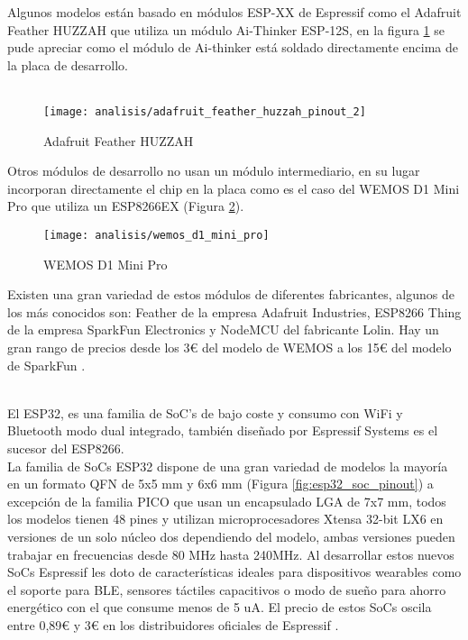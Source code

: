 \documentclass[../proyecto.tex]{subfiles}
\begin{document}
Algunos modelos están basado en módulos ESP-XX de Espressif como el Adafruit Feather HUZZAH \cite{adafruit_feather_huzzah} que utiliza un módulo Ai-Thinker ESP-12S, en la figura \ref{fig:adafruit_feather_huzzah_pinout_2} se pude apreciar como el módulo de Ai-thinker está soldado directamente encima de la placa de desarrollo.\\~\\

\begin{figure}[H]
\centering
\texttt{[image: analisis/adafruit\_feather\_huzzah\_pinout\_2]}
\caption{Adafruit Feather HUZZAH}
\label{fig:adafruit_feather_huzzah_pinout_2}
\end{figure}

Otros módulos de desarrollo no usan un módulo intermediario, en su lugar incorporan directamente el chip en la placa como es el caso del WEMOS D1 Mini Pro \cite{wemos_d1_mini_pro} que utiliza un ESP8266EX (Figura \ref{fig:wemos_d1_mini_pro}).\\

\begin{figure}[h]
\centering
\texttt{[image: analisis/wemos\_d1\_mini\_pro]}
\caption{WEMOS D1 Mini Pro}
\label{fig:wemos_d1_mini_pro}
\end{figure}

Existen una gran variedad de estos módulos de diferentes fabricantes, algunos de los más conocidos son:  Feather de la empresa Adafruit Industries, ESP8266 Thing de la empresa SparkFun Electronics y NodeMCU del fabricante Lolin. Hay un gran rango de precios desde los 3€ del modelo de WEMOS a los 15€ del modelo de SparkFun \cite{espressif_provider_digikey} \cite{espressif_provider_mouser}\cite{sparkfun_thing_official_page}.\\

\pagebreak

\\
El ESP32, es una familia de SoC's de bajo coste y consumo con WiFi y Bluetooth modo dual integrado, también diseñado por Espressif Systems \cite{esp32_overview} es el sucesor del ESP8266.\\

La familia de SoCs ESP32 dispone de una gran variedad de modelos la mayoría en un formato QFN de 5x5 mm y 6x6 mm (Figura \ref{fig:esp32_soc_pinout}) a excepción de la familia PICO que usan un encapsulado LGA de 7x7 mm, todos los modelos tienen 48 pines y utilizan microprocesadores Xtensa 32-bit LX6 en versiones de un solo núcleo dos dependiendo del modelo, ambas versiones pueden trabajar en frecuencias desde 80 MHz hasta 240MHz. Al desarrollar estos nuevos SoCs Espressif les doto de características ideales para dispositivos wearables como el soporte para BLE, sensores táctiles capacitivos o modo de sueño para ahorro energético con el que consume menos de 5  uA. El precio de estos SoCs oscila entre 0,89€ y 3€ en los distribuidores oficiales de Espressif \cite{espressif_provider_digikey} \cite{espressif_provider_mouser}.\\
\end{document}
